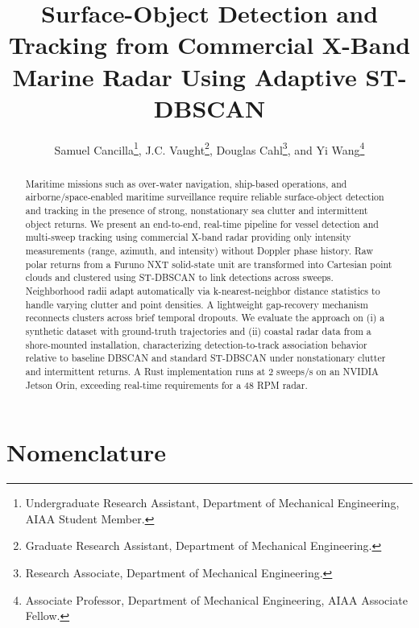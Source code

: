 \documentclass[conf]{new-aiaa}
\title{Surface-Object Detection and Tracking from Commercial X-Band Marine Radar Using Adaptive ST-DBSCAN}
\author{Samuel Cancilla\footnote{Undergraduate Research Assistant, Department of Mechanical Engineering, AIAA Student Member.}, J.C. Vaught\footnote{Graduate Research Assistant, Department of Mechanical Engineering.}, Douglas Cahl\footnote{Research Associate, Department of Mechanical Engineering.}, and Yi Wang\footnote{Associate Professor, Department of Mechanical Engineering, AIAA Associate Fellow.}}
\affil{University of South Carolina, Columbia, SC 29208}
\begin{document}
\maketitle

\begin{abstract}
Maritime missions such as over-water navigation, ship-based operations, and airborne/space-enabled maritime surveillance require reliable surface-object detection and tracking in the presence of strong, nonstationary sea clutter and intermittent object returns. We present an end-to-end, real-time pipeline for vessel detection and multi-sweep tracking using commercial X-band radar providing only intensity measurements (range, azimuth, and intensity) without Doppler phase history. Raw polar returns from a Furuno NXT solid-state unit are transformed into Cartesian point clouds and clustered using ST-DBSCAN to link detections across sweeps. Neighborhood radii adapt automatically via k-nearest-neighbor distance statistics to handle varying clutter and point densities. A lightweight gap-recovery mechanism reconnects clusters across brief temporal dropouts. We evaluate the approach on (i) a synthetic dataset with ground-truth trajectories and (ii) coastal radar data from a shore-mounted installation, characterizing detection-to-track association behavior relative to baseline DBSCAN and standard ST-DBSCAN under nonstationary clutter and intermittent returns. A Rust implementation runs at 2 sweeps/s on an NVIDIA Jetson Orin, exceeding real-time requirements for a 48 RPM radar.
\end{abstract}

\section{Nomenclature}
\end{document}
